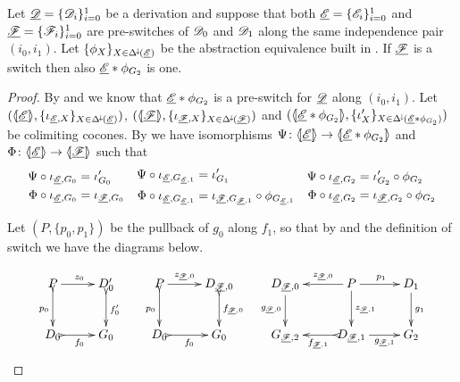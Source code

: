 \begin{proposition}\label{prop:pretosw} 	Let $\underline{\mathscr{D}}=\{\mathscr{D}_{i}\}_{i=0}^1$ be a derivation and suppose
	that both $\underline{\mathscr{E}}=\{\mathscr{E}_i\}_{i=0}^1$ and
	$\underline{\mathscr{F}}=\{\mathscr{F}_i\}_{i=0}^1$ are pre-switches of $\mathscr{D}_0$ and
	$\mathscr{D}_1$ along the same independence pair $(i_0, i_1)$. Let $\{\phi_X\}_{X\in \Delta^{\hspace{-1pt}\downarrow\hspace{-1pt}}(\underline{\mathscr{E}})}$ be the abstraction equivalence built in . If $\underline{\mathscr{F}}$ is a switch then also $\underline{\mathscr{E}}*\phi_{G_2}$ is one.
\end{proposition}
\begin{proof}
	By  and  we know that $\underline{\mathscr{E}}*\phi_{G_2}$ is a pre-switch for $\underline{\mathscr{D}}$ along $(i_0, i_1)$. Let $(\langle \hspace{-1.85pt}[ \underline{\mathscr{E}}]\hspace{-1.85pt}\rangle, \{\iota_{\underline{\mathscr{E}}, X}\}_{X\in \Delta^{\hspace{-1pt}\downarrow\hspace{-1pt}}(\underline{\mathscr{E}})})$, $(\langle \hspace{-1.85pt}[ \underline{\mathscr{F}}]\hspace{-1.85pt}\rangle, \{\iota_{\underline{\mathscr{F}}, X}\}_{X\in \Delta^{\hspace{-1pt}\downarrow\hspace{-1pt}}(\underline{\mathscr{F}})})$ and $(\langle \hspace{-1.85pt}[ \underline{\mathscr{E}}*\phi_{G_2}]\hspace{-1.85pt}\rangle , \{\iota'_{X}\}_{X\in \Delta^{\hspace{-1pt}\downarrow\hspace{-1pt}}(\underline{\mathscr{E}}*\phi_{G_2})})$ be colimiting cocones. By  we have isomorphisms $\Psi \colon \langle \hspace{-1.85pt}[ \underline{\mathscr{E}}]\hspace{-1.85pt}\rangle\to \langle \hspace{-1.85pt}[ \underline{\mathscr{E}}*\phi_{G_2}]\hspace{-1.85pt}\rangle $ and $\Phi\colon \langle \hspace{-1.85pt}[ \underline{\mathscr{E}}]\hspace{-1.85pt}\rangle\to \langle \hspace{-1.85pt}[ \underline{\mathscr{F}}]\hspace{-1.85pt}\rangle$ such that 
	\[\begin{split}
		\Psi\circ \iota_{\underline{\mathscr{E}}, G_0}&=\iota'_{G_0}\\\Phi\circ \iota_{\underline{\mathscr{E}}, G_0}&=\iota_{\underline{\mathscr{F}}, G_0}
	\end{split} \quad \begin{split}
	\Psi \circ \iota_{\underline{\mathscr{E}}, G_{\underline{\mathscr{E}}, 1}}&=\iota'_{G_1}\\
	\Phi \circ \iota_{\underline{\mathscr{E}}, G_{\underline{\mathscr{E}}, 1}}&=\iota_{\underline{\mathscr{F}}, G_{\underline{\mathscr{F}}, 1}}\circ \phi_{G_{\underline{\mathscr{E}}, 1}}
	\end{split} \quad \begin{split}
	\Psi \circ \iota_{\underline{\mathscr{E}}, G_2}&=\iota'_{G_2}\circ \phi_{G_2}\\
	\Phi \circ \iota_{\underline{\mathscr{E}}, G_2}&=\iota_{\underline{\mathscr{F}}, G_2}\circ \phi_{G_2}
	\end{split}\]
 	
 	Let $(P, \{p_0, p_1\})$ be the pullback of $g_{0}$ along $f_1$, so that by  	and the definition of switch we have the diagrams below. 
 	
 		\[\xymatrix{P\ar[r]^{z_0} \ar@{>->}[d]_{p_0}& D'_{0} \ar@{>->}[d]^{f'_{0}} & P \ar@{>->}[d]_{p_0}\ar[r]^-{z_{\der{F},0}} & D_{\der{F}, 0}\ar@{>->}[d]^{f_{\der{F},0}} & D_{\der{F},0}  \ar[d]_{g_{\der{F},0}}& P \ar[r]^{p_1} \ar[l]_-{z_{\der{F},0}} \ar[d]^{z_{\der{F},1}} & D_1 \ar[d]^{g_1}\\ D_0\ar@{>->}[r]_{f_0} & G_0 & D_0\ar@{>->}[r]_{f_0} & G_0 & G_{\der{F},2} & D_{\der{F},1} \ar[r]_-{g_{\der{F},1}} \ar@{>->}[l]^-{f_{\der{F},1}} & G_2}\]
 	

\end{proof}
